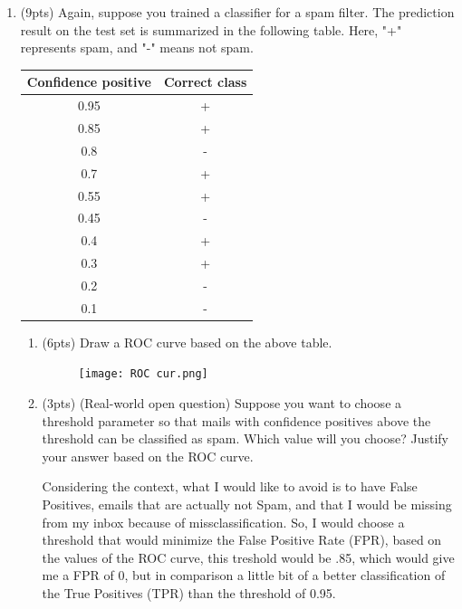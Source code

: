 \documentclass[a4paper]{article}
\theoremstyle{definition}
\newenvironment{soln}{
    \leavevmode\color{blue}\ignorespaces
}{}
\begin{document}
\begin{enumerate}
\begin{enumerate}
\begin{soln}
	\end{soln}
\end{enumerate}


\item (9pts) Again, suppose you trained a classifier for a spam filter. The prediction result on the test set is summarized in the following table. Here, "+" represents spam, and "-" means not spam.

\begin{center}
\begin{tabular}{ c  c }
\hline
Confidence positive & Correct class \\ \hline
0.95 & + \\
0.85 & + \\
0.8 & - \\
0.7 & + \\
0.55 & + \\
0.45 & - \\
0.4 & + \\
0.3 & + \\
0.2 & - \\
0.1 & - \\
\hline
\end{tabular}
\end{center}

\begin{enumerate}
	\item (6pts) Draw a ROC curve based on the above table.
	
	\begin{soln}
		 
	\begin{figure}[h]
		\centering
		\texttt{[image: ROC cur.png]}
	\end{figure}
	
	\end{soln}
	
	\item (3pts) (Real-world open question) Suppose you want to choose a threshold parameter so that mails with confidence positives above the threshold can be classified as spam. Which value will you choose? Justify your answer based on the ROC curve.
	
	\begin{soln} Considering the context, what I would like to avoid is to have False Positives, emails that are actually not Spam, and that I would be missing from my inbox because of missclassification. So, I would choose a threshold that would minimize the False Positive Rate (FPR), based on the values of the ROC curve, this treshold would be .85, which would give me a FPR of 0, but in comparison a little bit of a better classification of the True Positives (TPR) than the threshold of 0.95. \end{soln}
\end{enumerate}


\end{enumerate}
\end{document}
